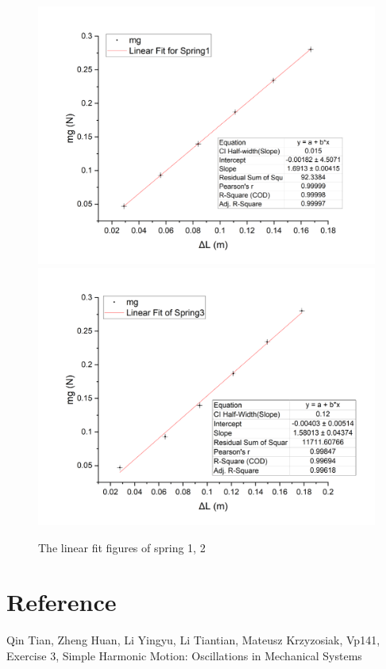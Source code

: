 \documentclass[12pt,a4paper]{article}
\begin{document}
\begin{center}
    \begin{figure}[H]
    \includegraphics[scale=0.35]{k1.png}
    \includegraphics[scale=0.35]{k2.png}
    \caption{The linear fit figures of spring 1, 2}
    \end{figure}
\end{center}


\section{Reference}
Qin Tian, Zheng Huan, Li Yingyu, Li Tiantian, Mateusz Krzyzosiak, Vp141, Exercise 3, Simple Harmonic Motion:
Oscillations in Mechanical Systems
\end{document}
